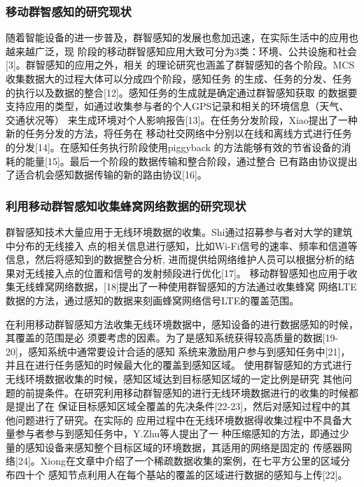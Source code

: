 \documentclass[UTF8]{ctexart}
\begin{document}
\subsubsection{移动群智感知的研究现状}
随着智能设备的进一步普及，群智感知的发展也愈加迅速，在实际生活中的应用也越来越广泛，现
阶段的移动群智感知应用大致可分为3类：环境、公共设施和社会[3]。群智感知的应用之外，相关
的理论研究也涵盖了群智感知的各个阶段。MCS收集数据大的过程大体可以分成四个阶段，感知任务
的生成、任务的分发、任务的执行以及数据的整合[12]。感知任务的生成就是确定通过群智感知获取
的数据要支持应用的类型，如通过收集参与者的个人GPS记录和相关的环境信息（天气、交通状况等）
来生成环境对个人影响报告[13]。在任务分发阶段，Xiao提出了一种新的任务分发的方法，将任务在
移动社交网络中分别以在线和离线方式进行任务的分发[14]。在感知任务执行阶段使用piggyback
的方法能够有效的节省设备的消耗的能量[15]。最后一个阶段的数据传输和整合阶段，通过整合
已有路由协议提出了适合机会感知数据传输的新的路由协议[16]。

\subsubsection{利用移动群智感知收集蜂窝网络数据的研究现状}

群智感知技术大量应用于无线环境数据的收集。Shi通过招募参与者对大学的建筑中分布的无线接入
点的相关信息进行感知，比如Wi-Fi信号的速率、频率和信道等信息，然后将感知到的数据整合分析,
进而提供给网络维护人员可以根据分析的结果对无线接入点的位置和信号的发射频段进行优化[17]。
移动群智感知也应用于收集无线蜂窝网络数据，[18]提出了一种使用群智感知的方法通过收集蜂窝
网络LTE数据的方法，通过感知的数据来刻画蜂窝网络信号LTE的覆盖范围。

在利用移动群智感知方法收集无线环境数据中，感知设备的进行数据感知的时候，其覆盖的范围是必
须要考虑的因素。为了是感知系统获得较高质量的数据[19-20]，感知系统中通常要设计合适的感知
系统来激励用户参与到感知任务中[21]，并且在进行任务感知的时候最大化的覆盖到感知区域。
使用群智感知的方式进行无线环境数据收集的时候，感知区域达到目标感知区域的一定比例是研究
其他问题的前提条件。在研究利用移动群智感知的进行无线环境数据进行的收集的时候都是提出了在
保证目标感知区域全覆盖的先决条件[22-23]，然后对感知过程中的其他问题进行了研究。在实际的
应用过程中在无线环境数据得收集过程中不具备大量参与者参与到感知任务中，Y.Zhu等人提出了一
种压缩感知的方法，即通过少量的感知设备来感知整个目标区域的环境数据，其适用的网络是固定的
传感器网络[24]。Xiong在文章中介绍了一个稀疏数据收集的案例，在七平方公里的区域分布四十个
感知节点利用人在每个基站的覆盖的区域进行数据的感知与上传[22]。
\end{document}
